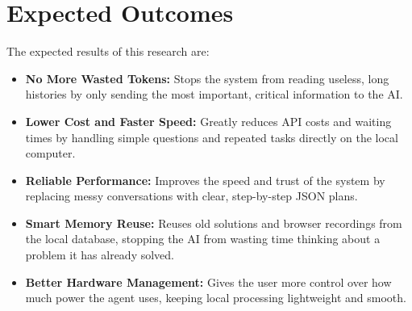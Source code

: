 \section{Expected Outcomes}
The expected results of this research are:\\
\begin{itemize}
    \item \textbf{No More Wasted Tokens:} Stops the system from reading useless, long histories by only sending the most important, critical information to the AI.
    \item \textbf{Lower Cost and Faster Speed:} Greatly reduces API costs and waiting times by handling simple questions and repeated tasks directly on the local computer.
    \item \textbf{Reliable Performance:} Improves the speed and trust of the system by replacing messy conversations with clear, step-by-step JSON plans.
    \item \textbf{Smart Memory Reuse:} Reuses old solutions and browser recordings from the local database, stopping the AI from wasting time thinking about a problem it has already solved.
    \item \textbf{Better Hardware Management:} Gives the user more control over how much power the agent uses, keeping local processing lightweight and smooth.
\end{itemize}
